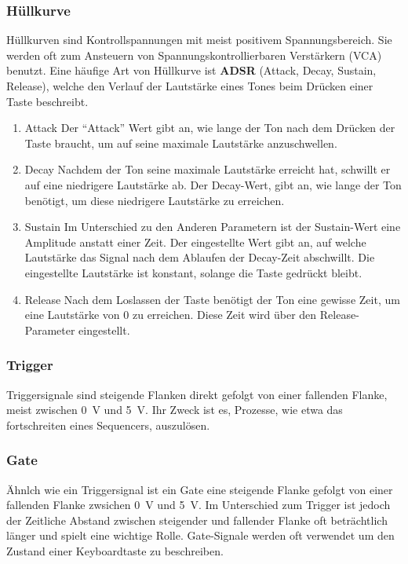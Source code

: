\subsubsection{Hüllkurve}
\label{sec:org780bbaa}
Hüllkurven sind Kontrollspannungen mit meist positivem Spannungsbereich. Sie werden oft zum Ansteuern von Spannungskontrollierbaren Verstärkern (VCA) benutzt. Eine häufige Art von Hüllkurve ist \textbf{ADSR} (Attack, Decay, Sustain, Release), welche den Verlauf der Lautstärke eines Tones beim Drücken einer Taste beschreibt. \cite{envelopes}

\begin{enumerate}
\item Attack
\label{sec:org67e97f2}
Der "`Attack"' Wert gibt an, wie lange der Ton nach dem Drücken der Taste braucht, um auf seine maximale Lautstärke anzuschwellen.

\item Decay
\label{sec:orga60ac08}
Nachdem der Ton seine maximale Lautstärke erreicht hat, schwillt er auf eine niedrigere Lautstärke ab. Der Decay-Wert, gibt an, wie lange der Ton benötigt, um diese niedrigere Lautstärke zu erreichen.

\item Sustain
\label{sec:org7ff1f38}
Im Unterschied zu den Anderen Parametern ist der Sustain-Wert eine Amplitude anstatt einer Zeit. Der eingestellte Wert gibt an, auf welche Lautstärke das Signal nach dem Ablaufen der Decay-Zeit abschwillt. Die eingestellte Lautstärke ist konstant, solange die Taste gedrückt bleibt.

\item Release
\label{sec:org14d1942}
Nach dem Loslassen der Taste benötigt der Ton eine gewisse Zeit, um eine Lautstärke von 0 zu erreichen. Diese Zeit wird über den Release-Parameter eingestellt.
\end{enumerate}

\subsubsection{Trigger}
\label{sec:orgef05727}
Triggersignale sind steigende Flanken direkt gefolgt von einer fallenden Flanke, meist zwischen \SI{0}{\volt} und \SI{5}{\volt}. Ihr Zweck ist es, Prozesse, wie etwa das fortschreiten eines Sequencers, auszulösen.

\subsubsection{Gate}
\label{sec:org6832c4a}
Ähnlch wie ein Triggersignal ist ein Gate eine steigende Flanke gefolgt von einer fallenden Flanke zwsichen \SI{0}{\volt} und \SI{5}{\volt}. Im Unterschied zum Trigger ist jedoch der Zeitliche Abstand zwischen steigender und fallender Flanke oft beträchtlich länger und spielt eine wichtige Rolle. Gate-Signale werden oft verwendet um den Zustand einer Keyboardtaste zu beschreiben.

